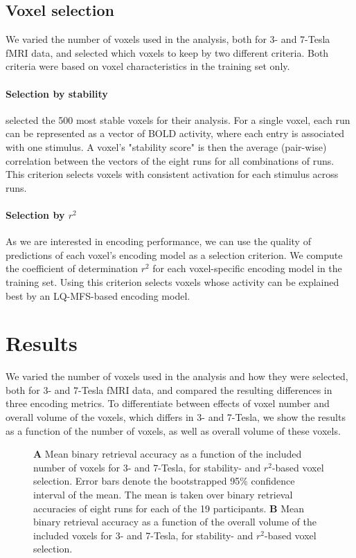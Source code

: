 \subsection*{Voxel selection}

We varied the number of voxels used in the analysis, both for 3- and 7-Tesla
f{MRI} data, and selected which voxels to keep by two different criteria. Both
criteria were based on voxel characteristics in the training set only.

\paragraph{Selection by stability}

\citet{ML08} selected the 500 most stable voxels for their analysis. For a
single voxel, each run can be represented as a vector of BOLD activity, where
each entry is associated with one stimulus. A voxel's "stability score" is then
the average (pair-wise) correlation between the vectors of the eight runs for
all combinations of runs.  This criterion selects voxels with consistent
activation for each stimulus across runs.

\paragraph{Selection by $r^2$}

As we are interested in encoding performance, we can use the quality of
predictions of each voxel's encoding model as a selection criterion. We compute
the coefficient of determination $r^2$ for each voxel-specific encoding model
in the training set. Using this criterion selects voxels whose activity can be
explained best by an LQ-MFS-based encoding model.

\section*{Results}

We varied the number of voxels used in the analysis and how they were selected,
both for 3- and 7-Tesla f{MRI} data, and compared the resulting differences in
three encoding metrics. To differentiate between effects of voxel number and
overall volume of the voxels, which differs in 3- and 7-Tesla, we show the
results as a function of the number of voxels, as well as overall volume of
these voxels.

\begin{figure}
  \centering
  \def\svgwidth{\linewidth}
  
	
  \caption{\textbf{A} Mean binary retrieval accuracy as a function of the
  included number of voxels for 3- and 7-Tesla, for stability- and $r^2$-based
  voxel selection. Error bars denote the bootstrapped 95\% confidence interval
  of the mean. The mean is taken over binary retrieval accuracies of eight runs
  for each of the 19 participants. \textbf{B} Mean binary retrieval accuracy as
a function of the overall volume of the included voxels for 3- and 7-Tesla, for
stability- and $r^2$-based voxel selection.}

 \label{fig:binary_retrieval}
\end{figure}

